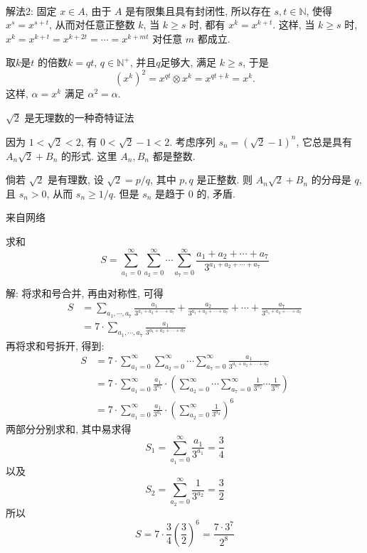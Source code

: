 ~

解法2: 固定 $x\in A$, 由于 $A$ 是有限集且具有封闭性, 所以存在 $s,t\in\mathbb{N}$, 使得 $x^s = x^{s+t}$, 从而对任意正整数 $k$, 当 $k\ge s$ 时, 都有 $x^k=x^{k+t}$. 这样, 当 $k\ge s$ 时, $x^k=x^{k+t}=x^{k+2t}=\cdots=x^{k+mt}$ 对任意 $m$ 都成立.

取$k$是$t$ 的倍数$k=qt$, $q\in\mathbb{N}^+$, 并且$q$足够大, 满足 $k\ge s$, 于是
\[ (x^k)^2 = x^{qt}\otimes x^k=x^{qt+k}=x^k .\]
这样, $\alpha=x^k$ 满足 $\alpha^2=\alpha$.

\newpage
\noindent $\sqrt{2}$ 是无理数的一种奇特证法

因为 $1<\sqrt{2}<2$, 有 $0<\sqrt{2}-1<2$. 考虑序列 $s_n = (\sqrt{2}-1)^n$, 它总是具有 $A_n\sqrt{2}+B_n$ 的形式. 这里 $A_n, B_n$ 都是整数.

倘若 $\sqrt{2}$ 是有理数, 设 $\sqrt{2} = p/q$, 其中 $p,q$ 是正整数. 则 $A_n\sqrt{2}+B_n$ 的分母是 $q$, 且 $s_n>0$, 从而 $s_n \ge 1/q$. 但是 $s_n$ 是趋于 0 的, 矛盾.

\newpage

\noindent 来自网络

求和
\[ 
S = \sum_{a_1=0}^{\infty}\sum_{a_2=0}^{\infty}\cdots\sum_{a_7=0}^{\infty}{\frac{a_1+a_2+\cdots+a_7}{3^{a_1+a_2+\cdots+a_7}}}
\]

解: 将求和号合并, 再由对称性, 可得
\begin{align*}
S &= \sum_{a_1,\cdots,a_7} {\frac{a_1}{3^{a_1+a_2+\cdots+a_7}} + \frac{a_2}{3^{a_1+a_2+\cdots+a_7}} + \cdots + \frac{a_7}{3^{a_1+a_2+\cdots+a_7}}} \\
 &= 7\cdot\sum_{a_1,\cdots,a_7} {\frac{a_1}{3^{a_1+a_2+\cdots+a_7}}}
\end{align*}
再将求和号拆开, 得到:
\begin{align*}
S &= 7\cdot \sum_{a_1=0}^{\infty}\sum_{a_2=0}^{\infty}\cdots\sum_{a_7=0}^{\infty}{\frac{a_1}{3^{a_1+a_2+\cdots+a_7}}} \\
&=  7\cdot \sum_{a_1=0}^{\infty}\frac{a_1}{3^{a_1}}\cdot\left(\sum_{a_2=0}^{\infty}\cdots\sum_{a_7=0}^{\infty}{\frac{1}{3^{a_2}}\cdots\frac{1}{3^{a_7}}}\right)\\
&= 7\cdot \sum_{a_1=0}^{\infty}\frac{a_1}{3^{a_1}}\cdot\left(\sum_{a_2=0}^{\infty}{\frac{1}{3^{a_2}}}\right)^6
\end{align*}
两部分分别求和, 其中易求得
\[
S_1 = \sum_{a_1=0}^{\infty}\frac{a_1}{3^{a_1}} = \frac{3}{4}
\]
以及 
\[ S_2 = \sum_{a_2=0}^{\infty}\frac{1}{3^{a_2}} = \frac{3}{2}
\]
所以 
\[
S = 7\cdot\frac{3}{4}(\frac{3}{2})^6 = \frac{7\cdot 3^7}{2^8}
\]


